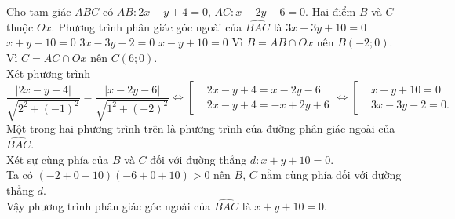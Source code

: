 \begin{ex}%
	Cho tam giác $ABC$ có $AB\colon 2x-y+4=0$, $AC\colon x-2y-6=0$. Hai điểm $B$ và $C$ thuộc $Ox$. Phương trình phân giác góc ngoài của $\widehat{BAC}$ là
	\choice
	{$3x+3y+10=0$}
	{\True $x+y+10=0$}
	{$3x-3y-2=0$}
	{$x-y+10=0$}
	\loigiai
	{
		Vì $B=AB\cap Ox$ nên $B(-2;0)$.\\
		Vì $C=AC\cap Ox$ nên $C(6;0)$.\\
		Xét phương trình
		\[\dfrac{|2x-y+4|}{\sqrt{2^2+(-1)^2}} = \dfrac{|x-2y-6|}{\sqrt{1^2+(-2)^2}} \Leftrightarrow \left[\begin{aligned}&2x-y+4=x-2y-6 \\&2x-y+4=-x+2y+6\end{aligned}\right. \Leftrightarrow \left[\begin{aligned}&x+y+10=0 \\&3x-3y-2=0.\end{aligned}\right.\]
		Một trong hai phương trình trên là phương trình của đường phân giác ngoài của $\widehat{BAC}$.\\
		Xét sự cùng phía của $B$ và $C$ đối với đường thẳng $d\colon x+y+10=0$.\\
		Ta có $\left(-2+0+10\right)\left(-6+0+10\right)>0$ nên $B$, $C$ nằm cùng phía đối với đường thẳng $d$.\\
		Vậy phương trình phân giác góc ngoài của $\widehat{BAC}$ là $x+y+10=0$.
	}
\end{ex}

